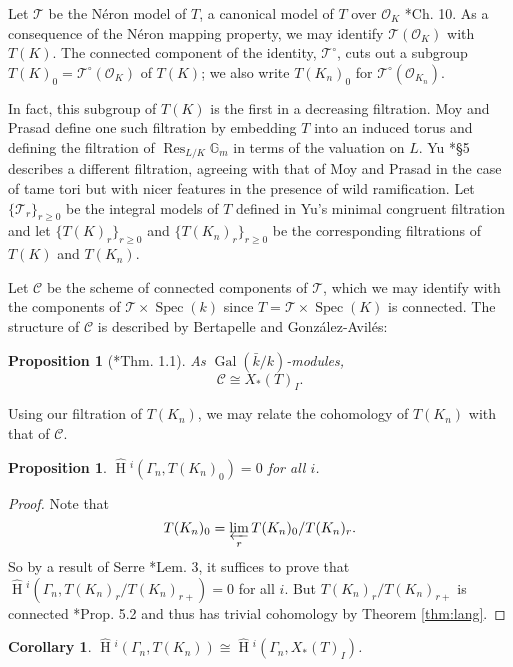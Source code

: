\documentclass{mrlart7}
\theoremstyle{plain}
\newtheorem{proposition}[theorem]{Proposition}
\newtheorem{corollary}[theorem]{Corollary}
\newcommand{\HT}[1]{\hat{\HH}{}^{#1}}
\theoremstyle{definition}
\numberwithin{equation}{section}
\DeclareMathOperator{\Gal}{Gal}
\DeclareMathOperator{\HH}{H}
\DeclareMathOperator{\Spec}{Spec}
\DeclareMathOperator{\Res}{Res}
\newcommand{\TT}{\mathcal{T}}
\newcommand{\C}{\mathcal{C}}
\newcommand{\OK}{\mathcal{O}_K}
\newcommand{\OKn}{\mathcal{O}_{K_n}}
\newcommand{\Gm}{\mathbb{G}_m}
\newcommand{\invlim}[1]{\varprojlim_{#1}}
\begin{document}
Let $\TT$ be the N\'eron model of $T$, a canonical model of $T$
over $\OK$ \cite{bosch-lutkebohmert-reynaud:NeronModels}*{Ch. 10}.
As a consequence of the N\'eron mapping
property, we may identify $\TT(\OK)$ with $T(K)$.  The connected
component of the identity, $\TT^\circ$, cuts out a subgroup
$T(K)_0 = \TT^\circ(\OK)$ of $T(K)$; we also write $T(K_n)_0$ for
$\TT^\circ(\OKn)$.

In fact, this subgroup of $T(K)$ is the first in a decreasing filtration.
Moy and Prasad \cite{moy-prasad:96a}
define one such filtration by
embedding $T$ into an induced torus and defining the filtration of
$\Res_{L/K} \Gm$ in terms of the valuation on $L$.  Yu \cite{yu:03a}*{\S 5}
describes a different filtration, agreeing with that of Moy and Prasad
in the case of tame tori but with nicer features in the presence of wild
ramification.  Let $\{\TT_r\}_{r \ge 0}$ be the integral models of $T$ defined in Yu's
minimal congruent filtration and let $\{T(K)_r\}_{r \ge 0}$ and
$\{T(K_n)_r\}_{r \ge 0}$ be the corresponding filtrations of $T(K)$ and
$T(K_n)$.

Let $\C$ be the scheme of
connected components of $\TT$,
which we may identify with the
components of $\TT \times \Spec(k)$ since $T = \TT \times \Spec(K)$
is connected.  The structure of $\C$ is described by Bertapelle and Gonz\'alez-Avil\'es:

\begin{proposition}[{\cite{bertrapelle-gonzales:13b}*{Thm. 1.1}}]
As $\Gal(\bar{k}/k)$-modules,
\[
\C \cong X_*(T)_I.
\]
\end{proposition}

Using our filtration of $T(K_n)$, we may relate the cohomology of $T(K_n)$
with that of $\C$.

\begin{proposition}\label{prop:T0_cohom_triv}
$\HT{i}(\Gamma_n, T(K_n)_0) = 0$ for all $i$.
\end{proposition}
\begin{proof}
Note that
$$T(K_n)_0 = \invlim{r} T(K_n)_0 / T(K_n)_r.$$
So by a result of Serre \cite{serre:LocalClassFieldThy}*{Lem. 3}, it suffices to prove that
\\ $\HT{i}(\Gamma_n, T(K_n)_r / T(K_n)_{r+}) = 0$ for all $i$.  But $T(K_n)_r / T(K_n)_{r+}$
is connected \cite{yu:03a}*{Prop. 5.2} and thus has trivial cohomology by
Theorem \ref{thm:lang}.
\end{proof}

\begin{corollary} \label{cor:cohom_tori}
$\HT{i}(\Gamma_n, T(K_n)) \cong \HT{i}(\Gamma_n, X_*(T)_I)$.
\end{corollary}
\end{document}
